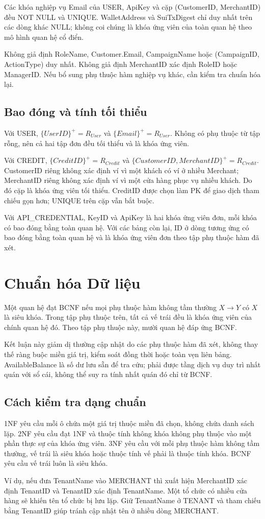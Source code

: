 Các khóa nghiệp vụ Email của USER, ApiKey và cặp (CustomerID, MerchantID) đều NOT NULL và UNIQUE. WalletAddress và SuiTxDigest chỉ duy nhất trên các dòng khác NULL; không coi chúng là khóa ứng viên của toàn quan hệ theo mô hình quan hệ cổ điển.

Không giả định RoleName, Customer.Email, CampaignName hoặc (CampaignID, ActionType) duy nhất. Không giả định MerchantID xác định RoleID hoặc ManagerID. Nếu bổ sung phụ thuộc hàm nghiệp vụ khác, cần kiểm tra chuẩn hóa lại.

\subsection{Bao đóng và tính tối thiểu}
Với USER, $\{UserID\}^{+}=R_{User}$ và $\{Email\}^{+}=R_{User}$. Không có phụ thuộc từ tập rỗng, nên cả hai tập đơn đều tối thiểu và là khóa ứng viên.

Với CREDIT, $\{CreditID\}^{+}=R_{Credit}$ và $\{CustomerID,MerchantID\}^{+}=R_{Credit}$. CustomerID riêng không xác định ví vì một khách có ví ở nhiều Merchant; MerchantID riêng không xác định ví vì một cửa hàng phục vụ nhiều khách. Do đó cặp là khóa ứng viên tối thiểu. CreditID được chọn làm PK để giao dịch tham chiếu gọn hơn; UNIQUE trên cặp vẫn bắt buộc.

Với API\_CREDENTIAL, KeyID và ApiKey là hai khóa ứng viên đơn, mỗi khóa có bao đóng bằng toàn quan hệ. Với các bảng còn lại, ID ở dòng tương ứng có bao đóng bằng toàn quan hệ và là khóa ứng viên đơn theo tập phụ thuộc hàm đã xét.

\section{Chuẩn hóa Dữ liệu}
Một quan hệ đạt BCNF nếu mọi phụ thuộc hàm không tầm thường $X \rightarrow Y$ có $X$ là siêu khóa. Trong tập phụ thuộc trên, tất cả vế trái đều là khóa ứng viên của chính quan hệ đó. Theo tập phụ thuộc này, mười quan hệ đáp ứng BCNF.

Kết luận này giảm dị thường cập nhật do các phụ thuộc hàm đã xét, không thay thế ràng buộc miền giá trị, kiểm soát đồng thời hoặc toàn vẹn liên bảng. AvailableBalance là số dư lưu sẵn để tra cứu; phải được tầng dịch vụ duy trì nhất quán với sổ cái, không thể suy ra tính nhất quán đó chỉ từ BCNF.


\subsection{Cách kiểm tra dạng chuẩn}
1NF yêu cầu mỗi ô chứa một giá trị thuộc miền đã chọn, không chứa danh sách lặp. 2NF yêu cầu đạt 1NF và thuộc tính không khóa không phụ thuộc vào một phần thực sự của khóa ứng viên. 3NF yêu cầu với mỗi phụ thuộc hàm không tầm thường, vế trái là siêu khóa hoặc thuộc tính vế phải là thuộc tính khóa. BCNF yêu cầu vế trái luôn là siêu khóa.

Ví dụ, nếu đưa TenantName vào MERCHANT thì xuất hiện MerchantID xác định TenantID và TenantID xác định TenantName. Một tổ chức có nhiều cửa hàng sẽ khiến tên tổ chức bị lưu lặp. Giữ TenantName ở TENANT và tham chiếu bằng TenantID giúp tránh cập nhật tên ở nhiều dòng MERCHANT.
